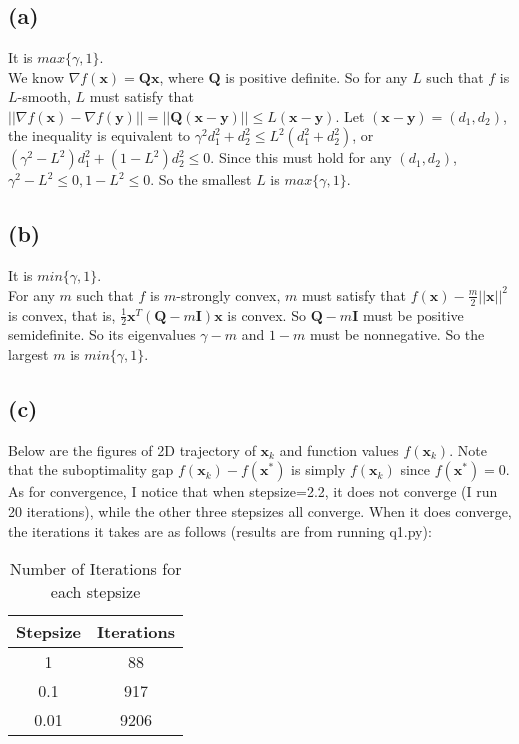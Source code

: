 \documentclass[12pt,letterpaper]{article}
\begin{document}
\section{}
\subsection*{(a)}
It is $max\{\gamma,1\}$.\\
We know $\nabla f(\boldsymbol{x})=\boldsymbol{Qx}$, where $\boldsymbol{Q}$ is positive definite. So for any $L$ such that $f$ is $L$-smooth, $L$ must satisfy that $||\nabla f(\boldsymbol{x})-\nabla f(\boldsymbol{y})||=||\boldsymbol{Q}(\boldsymbol{x}-\boldsymbol{y})||\leq L(\boldsymbol{x}-\boldsymbol{y})$. Let $(\boldsymbol{x}-\boldsymbol{y})=(d_1,d_2)$, the inequality is equivalent to $\gamma^2d_1^2+d_2^2\leq L^2(d_1^2+d_2^2)$, or $(\gamma^2-L^2)d_1^2+(1-L^2)d_2^2\leq 0$. Since this must hold for any $(d_1,d_2)$, $\gamma^2-L^2\leq0,1-L^2\leq0$. So the smallest $L$ is $max\{\gamma,1\}$.
\subsection*{(b)}
It is $min\{\gamma,1\}$.\\
For any $m$ such that $f$ is $m$-strongly convex, $m$ must satisfy that $f(\boldsymbol{x})-\frac{m}{2}||\boldsymbol{x}||^2$ is convex, that is, $\frac{1}{2}\boldsymbol{x}^T(\boldsymbol{Q}-m\boldsymbol{I})\boldsymbol{x}$ is convex. So $\boldsymbol{Q}-m\boldsymbol{I}$ must be positive semidefinite. So its eigenvalues $\gamma-m$ and $1-m$ must be nonnegative. So the largest $m$ is $min\{\gamma,1\}$.
\subsection*{(c)}
Below are the figures of 2D trajectory of $\boldsymbol{x}_k$ and function values $f(\boldsymbol{x}_k)$. Note that the suboptimality gap $f(\boldsymbol{x}_k)-f(\boldsymbol{x}^*)$ is simply $f(\boldsymbol{x}_k)$ since $f(\boldsymbol{x}^*)=0$.\\
As for convergence, I notice that when stepsize=2.2, it does not converge (I run 20 iterations), while the other three stepsizes all converge. When it does converge, the iterations it takes are as follows (results are from running q1.py):\\
\begin{table}[h]
    \centering
    \begin{tabular}{c|c}
         Stepsize&Iterations  \\\hline
         1&88\\
         0.1&917\\
         0.01&9206
    \end{tabular}
    \caption{Number of Iterations for each stepsize}
    \label{Iters}
\end{table}
\end{document}
